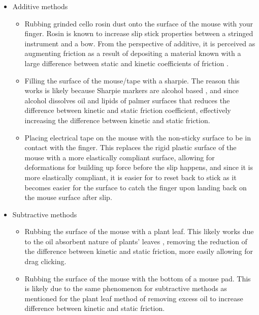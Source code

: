 \documentclass[12pt]{article}
\begin{document}
\begin{itemize}
    \item Additive methods
        \begin{itemize}
            \item Rubbing grinded cello rosin dust onto the surface of the mouse with your finger. Rosin is known to increase slip stick properties between a stringed instrument and a bow. From the perspective of additive, it is perceived as augmenting friction as a result of depositing a material known with a large difference between static and kinetic coefficients of friction \parencite{woodhouse2025rosin}. %
            \item Filling the surface of the mouse/tape with a sharpie. The reason this works is likely because Sharpie markers are alcohol based \parencite{sharpie_faq}, and since alcohol dissolves oil \parencite{saintleger1985sebum,bommannan1991ethanol} and lipids of palmer surfaces that reduces the difference between kinetic and static friction coefficient, effectively increasing the difference between kinetic and static friction.
            \item Placing electrical tape on the mouse with the non-sticky surface to be in contact with the finger. This replaces the rigid plastic surface of the mouse with a more elastically compliant surface, allowing for deformations for building up force before the slip happens, and since it is more elastically compliant, it is easier for to reset back to stick as it becomes easier for the surface to catch the finger upon landing back on the mouse surface after slip.
        \end{itemize}
    \item Subtractive methods
        \begin{itemize}
            \item Rubbing the surface of the mouse with a plant leaf. This likely works due to the oil absorbent nature of plants' leaves \parencite{gorb2017oil}\parencite{ghalia2026posidonia}, removing the reduction of the difference between kinetic and static friction, more easily allowing for drag clicking.
            \item Rubbing the surface of the mouse with the bottom of a mouse pad. This is likely due to the same phenomenon for subtractive methods as mentioned for the plant leaf method of removing excess oil to increase difference between kinetic and static friction.
        \end{itemize}
\end{itemize}
\end{document}
